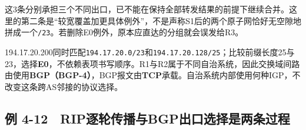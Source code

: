 这3条分别承担三个不同出口，已不能在保持全部转发结果的前提下继续合并。这里的第二条是``较宽覆盖加更具体例外''，不是声称S1后的两个原子网恰好无空隙地拼成一个\texttt{/\allowbreak{}23}。若删除E0例外，原本应直达的分组就会误发给R3。

194.17.20.200同时匹配\texttt{194.\allowbreak{}17.\allowbreak{}20.\allowbreak{}0/\allowbreak{}23}和\texttt{194.\allowbreak{}17.\allowbreak{}20.\allowbreak{}128/\allowbreak{}25}；比较前缀长度25与23，选择\textbf{E0}，不依赖表项书写顺序。R1与R2属于不同自治系统，因此交换域间路由使用\textbf{BGP（BGP-4）}，BGP报文由\textbf{TCP}承载。自治系统内部使用何种IGP，不改变这条跨AS邻接的协议选择。

\subsection{例 4-12　RIP逐轮传播与BGP出口选择是两条过程}\label{CN04-ex12}


